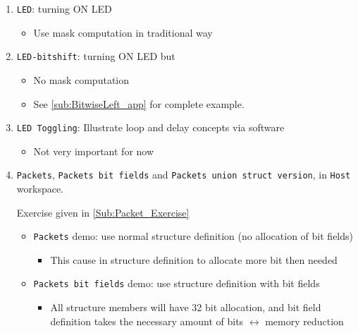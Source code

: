 \begin{enumerate}    
    
    \item \verb|LED|: turning ON LED

    \begin{itemize}
        \item Use mask computation in traditional way

    \end{itemize}

    \item \verb|LED-bitshift|: turning ON LED but 

    \begin{itemize}
        \item No mask computation
        
		\item  See \ref{sub:BitwiseLeft_app} for complete example.       
        
    \end{itemize}

\item \verb|LED Toggling|: Illustrate loop and delay concepts via software

    \begin{itemize}
        \item Not very important for now
    \end{itemize}


\item \verb|Packets|, \verb|Packets bit fields| and \verb|Packets union struct version|, in \verb|Host| workspace. 

Exercise given in \ref{Sub:Packet_Exercise}

\begin{itemize}
    \item \verb|Packets| demo: use normal structure definition (no allocation of bit fields)

    \begin{itemize}
        \item This cause in structure definition to allocate more bit then needed
    \end{itemize}


    \item \verb|Packets bit fields| demo: use structure definition with bit fields

    \begin{itemize}
        \item All structure members will have 32 bit allocation, and bit field definition takes the necessary amount of bits $\leftrightarrow$ memory reduction
    \end{itemize}


\end{itemize}
\end{enumerate}
